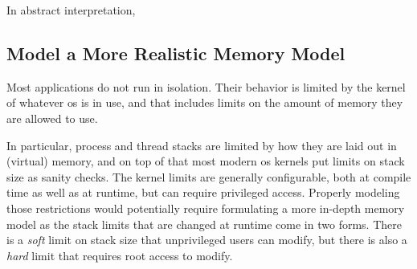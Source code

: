 In abstract interpretation,

\subsection{Model a More Realistic Memory Model}
Most applications do not run in isolation. Their behavior is limited by
the kernel of whatever \ac{os} is in use,
and that includes limits on the amount of memory they are allowed to use.

In particular, process and thread stacks are limited
by how they are laid out in (virtual) memory, and on top of that
most modern \ac{os} kernels put limits on stack size as sanity checks.
The kernel limits are generally configurable,
both at compile time as well as at runtime, but can require privileged access.
Properly modeling those restrictions
would potentially require formulating a more in-depth memory model
as the stack limits that are changed at runtime come in two forms.
There is a \emph{soft} limit on stack size that unprivileged users
can modify, but there is also a \emph{hard} limit
that requires root access to modify.
